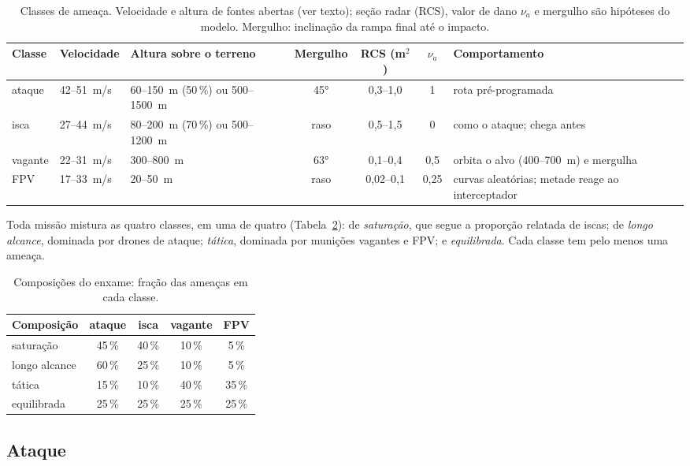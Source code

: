 \begin{table}[t]
\centering
\caption{Classes de ameaça. Velocidade e altura de fontes abertas (ver texto); seção radar (RCS), valor de dano $\nu_a$
e mergulho são hipóteses do modelo. Mergulho: inclinação da rampa final até o impacto.}
\label{tab:classes}
\small
\begin{tabularx}{\textwidth}{@{}lXXcccX@{}}
\toprule
Classe & Velocidade & Altura sobre o terreno & Mergulho & RCS (m$^2$) & $\nu_a$ & Comportamento \\
\midrule
ataque & 42--51~m/s & 60--150~m (50\,\%) ou 500--1500~m & 45° & 0,3--1,0 & 1 & rota pré-programada \\
isca & 27--44~m/s & 80--200~m (70\,\%) ou 500--1200~m & raso & 0,5--1,5 & 0 & como o ataque; chega antes \\
vagante & 22--31~m/s & 300--800~m & 63° & 0,1--0,4 & 0,5 & orbita o alvo (400--700~m) e mergulha \\
FPV & 17--33~m/s & 20--50~m & raso & 0,02--0,1 & 0,25 & curvas aleatórias; metade reage ao interceptador \\
\bottomrule
\end{tabularx}
\end{table}

Toda missão mistura as quatro classes, em uma de quatro  (Tabela~\ref{tab:composicoes}): de
\emph{saturação}, que segue a proporção relatada de iscas; de \emph{longo alcance}, dominada por drones de ataque;
\emph{tática}, dominada por munições vagantes e FPV; e \emph{equilibrada}. Cada classe tem pelo menos uma ameaça.

\begin{table}[t]
\centering
\caption{Composições do enxame: fração das ameaças em cada classe.}
\label{tab:composicoes}
\small
\begin{tabular}{@{}lcccc@{}}
\toprule
Composição & ataque & isca & vagante & FPV \\
\midrule
saturação & 45\,\% & 40\,\% & 10\,\% & 5\,\% \\
longo alcance & 60\,\% & 25\,\% & 10\,\% & 5\,\% \\
tática & 15\,\% & 10\,\% & 40\,\% & 35\,\% \\
equilibrada & 25\,\% & 25\,\% & 25\,\% & 25\,\% \\
\bottomrule
\end{tabular}
\end{table}

\subsection{Ataque}
